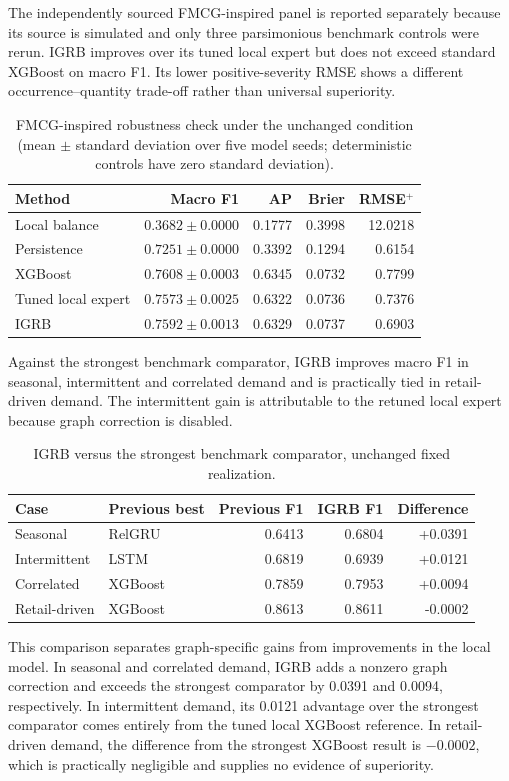 The independently sourced FMCG-inspired panel is reported separately because its source is simulated and only three parsimonious benchmark controls were rerun. IGRB improves over its tuned local expert but does not exceed standard XGBoost on macro F1. Its lower positive-severity RMSE shows a different occurrence--quantity trade-off rather than universal superiority.
\begin{table}[tb]\centering\small
\caption{FMCG-inspired robustness check under the unchanged condition (mean $\pm$ standard deviation over five model seeds; deterministic controls have zero standard deviation).}\label{tab:fmcg}
\begin{tabular}{lrrrr}\toprule Method & Macro F1 & AP & Brier & RMSE$^+$ \\\midrule
Local balance & $0.3682\pm0.0000$ & 0.1777 & 0.3998 & 12.0218 \\
Persistence & $0.7251\pm0.0000$ & 0.3392 & 0.1294 & 0.6154 \\
XGBoost & $0.7608\pm0.0003$ & 0.6345 & 0.0732 & 0.7799 \\
Tuned local expert & $0.7573\pm0.0025$ & 0.6322 & 0.0736 & 0.7376 \\
IGRB & $0.7592\pm0.0013$ & 0.6329 & 0.0737 & 0.6903 \\
\bottomrule\end{tabular}\end{table}
Against the strongest benchmark comparator, IGRB improves macro F1 in seasonal, intermittent and correlated demand and is practically tied in retail-driven demand. The intermittent gain is attributable to the retuned local expert because graph correction is disabled.
\begin{table}[tb]\centering\small
\caption{IGRB versus the strongest benchmark comparator, unchanged fixed realization.}\label{tab:previous}
\begin{tabular}{llrrr}\toprule Case & Previous best & Previous F1 & IGRB F1 & Difference \\\midrule
Seasonal & RelGRU & 0.6413 & 0.6804 & +0.0391 \\
Intermittent & LSTM & 0.6819 & 0.6939 & +0.0121 \\
Correlated & XGBoost & 0.7859 & 0.7953 & +0.0094 \\
Retail-driven & XGBoost & 0.8613 & 0.8611 & -0.0002 \\
\bottomrule\end{tabular}\end{table}
This comparison separates graph-specific gains from improvements in the local model. In seasonal and correlated demand, IGRB adds a nonzero graph correction and exceeds the strongest comparator by 0.0391 and 0.0094, respectively. In intermittent demand, its 0.0121 advantage over the strongest comparator comes entirely from the tuned local XGBoost reference. In retail-driven demand, the difference from the strongest XGBoost result is $-0.0002$, which is practically negligible and supplies no evidence of superiority.


